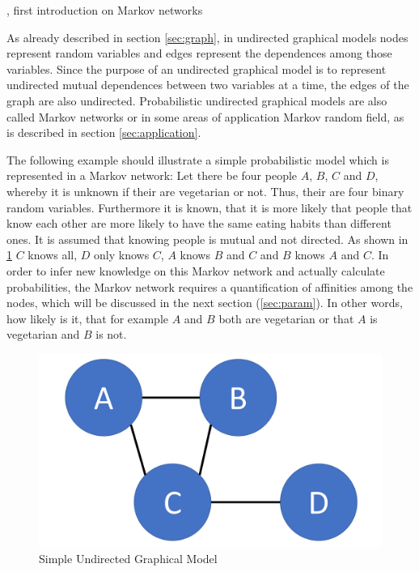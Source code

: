 \cite{hammersley1971markov}, first introduction on Markov networks
\cite{pearl2014probabilistic}

As already described in section \ref{sec:graph}, in undirected graphical models nodes represent random variables and edges represent the dependences among those variables. Since the purpose of an undirected graphical model is to represent undirected mutual dependences between two variables at a time, the edges of the graph are also undirected. Probabilistic undirected graphical models are also called Markov networks or in some areas of application Markov random field, as is described in section \ref{sec:application}.

The following example should illustrate a simple probabilistic model which is represented in a Markov network: Let there be four people $A$, $B$, $C$ and $D$, whereby it is unknown if their are vegetarian or not. Thus, their are four binary random variables. Furthermore it is known, that it is more likely that people that know each other are more likely to have the same eating habits than different ones. It is assumed that knowing people is mutual and not directed. As shown in \ref{fig:basic} $C$ knows all, $D$ only knows $C$, $A$ knows $B$ and $C$ and $B$ knows $A$ and $C$. In order to infer new knowledge on this Markov network and actually calculate probabilities, the Markov network requires a quantification of affinities among the nodes, which will be discussed in the next section (\ref{sec:param}). In other words, how likely is it, that for example $A$ and $B$ both are vegetarian or that $A$ is vegetarian and $B$ is not.

\begin{figure}[htpb]
  \centering
  	\includegraphics[scale=0.3]{img/basic.pdf} 
  \caption{Simple Undirected Graphical Model}
  \label{fig:basic}
\end{figure}

